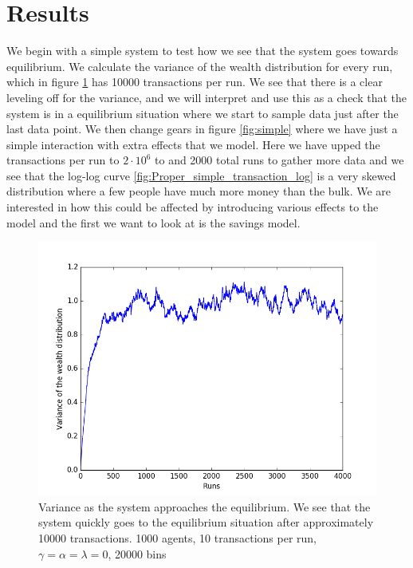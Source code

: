 \documentclass[a4paper,11pt]{article}
\begin{document}
{\section*{Results}

We begin with a simple system to test how we see that the system goes towards equilibrium. We calculate the variance of the wealth distribution for every run, which in figure \ref{fig:testinit} has 10000 transactions per run. We see that there is a clear leveling off for the variance, and we will interpret and use this as a check that the system is in a equilibrium situation where we start to sample data just after the last data point. We then change gears in figure \ref{fig:simple} where we have just a simple interaction with extra effects that we model. Here we have upped the transactions per run to $2\cdot 10^6$ to and 2000 total runs to gather more data and we see that the log-log curve \ref{fig:Proper_simple_transaction_log} is a very skewed distribution where a few people have much more money than the bulk. We are interested in how this could be affected by introducing various effects to the model and the first we want to look at is the savings model. 

\begin{figure}[H]
	\centering
	\includegraphics[scale=0.5]{testinit}
	\caption{Variance as the system approaches the equilibrium. We see that the system quickly goes to the equilibrium situation after approximately 10000 transactions.  1000 agents, 10 transactions per run, $\gamma=\alpha=\lambda = 0$,  20000 bins  }
	\label{fig:testinit}
\end{figure}

}
\end{document}
